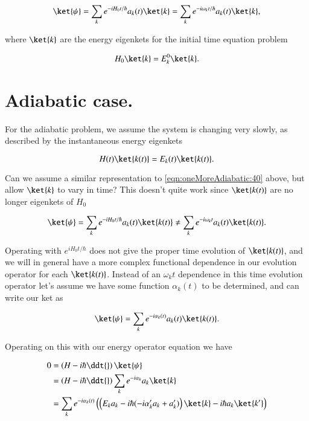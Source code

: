\begin{equation}\label{eqn:oneMoreAdiabatic:40}
\ket{\psi} 
= \sum_k e^{-i H_0 t/\hbar} a_k(t) \ket{k}
= \sum_k e^{-i \omega_k t/\hbar} a_k(t) \ket{k},
\end{equation}

where $\ket{k}$ are the energy eigenkets for the initial time equation problem

\begin{equation}\label{eqn:oneMoreAdiabatic:50}
H_0 \ket{k} = E_k^0 \ket{k}.
\end{equation}

\section{Adiabatic case.}

For the adiabatic problem, we assume the system is changing very slowly, as described by the instantaneous energy eigenkets

\begin{equation}\label{eqn:oneMoreAdiabatic:60}
H(t) \ket{k(t)} = E_k(t) \ket{k(t)}.
\end{equation}

Can we assume a similar representation to \ref{eqn:oneMoreAdiabatic:40} above, but allow $\ket{k}$ to vary in time?  This doesn't quite work since $\ket{k(t)}$ are no longer eigenkets of $H_0$

\begin{equation}\label{eqn:oneMoreAdiabatic:10b}
\ket{\psi} 
= \sum_k e^{-i H_0 t/\hbar} a_k(t) \ket{k(t)}
\ne \sum_k e^{-i \omega_k t} a_k(t) \ket{k(t)}.
\end{equation}

Operating with $e^{i H_0 t/\hbar}$ does not give the proper time evolution of $\ket{k(t)}$, and we will in general have a more complex functional dependence in our evolution operator for each $\ket{k(t)}$.  Instead of an $\omega_k t$ dependence in this time evolution operator let's assume we have some function $\alpha_k(t)$ to be determined, and can write our ket as

\begin{equation}\label{eqn:oneMoreAdiabatic:70}
\ket{\psi} 
= \sum_k e^{-i \alpha_k(t)} a_k(t) \ket{k(t)}.
\end{equation}

Operating on this with our energy operator equation we have

\begin{align*}
0 
&=
\left(H - i \hbar \ddt{} \right) \ket{\psi} \\
&=
\left(H - i \hbar \ddt{} \right) \sum_k e^{-i \alpha_k} a_k \ket{k} \\
&=
\sum_k e^{-i \alpha_k(t)} 
\left( 
\left( 
E_k a_k
-i \hbar(-i \alpha_k' a_k + a_k')
\right) 
\ket{k}
-i \hbar
a_k \ket{k'}
\right) 
\\
\end{align*}

